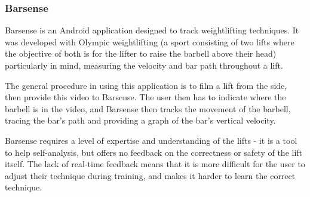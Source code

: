 \subsubsection{Barsense}

Barsense\cite{barsense} is an Android application designed to track weightlifting techniques. It was developed with Olympic weightlifting (a sport consisting of two lifts where the objective of both is for the lifter to raise the barbell above their head) particularly in mind, measuring the velocity and bar path throughout a lift.

The general procedure in using this application is to film a lift from the side, then provide this video to Barsense. The user then has to indicate where the barbell is in the video, and Barsense then tracks the movement of the barbell, tracing the bar's path and providing a graph of the bar's vertical velocity.

Barsense requires a level of expertise and understanding of the lifts - it is a tool to help self-analysis, but offers no feedback on the correctness or safety of the lift itself. The lack of real-time feedback means that it is more difficult for the user to adjust their technique during training, and makes it harder to learn the correct technique.